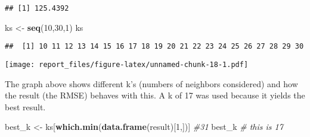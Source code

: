 \documentclass[
]{article}
\newenvironment{Shaded}{\begin{snugshade}}{\end{snugshade}}
\newcommand{\CommentTok}[1]{\textcolor[rgb]{0.56,0.35,0.01}{\textit{#1}}}
\newcommand{\ControlFlowTok}[1]{\textcolor[rgb]{0.13,0.29,0.53}{\textbf{#1}}}
\newcommand{\DataTypeTok}[1]{\textcolor[rgb]{0.13,0.29,0.53}{#1}}
\newcommand{\DecValTok}[1]{\textcolor[rgb]{0.00,0.00,0.81}{#1}}
\newcommand{\KeywordTok}[1]{\textcolor[rgb]{0.13,0.29,0.53}{\textbf{#1}}}
\newcommand{\NormalTok}[1]{#1}
\newcommand{\OperatorTok}[1]{\textcolor[rgb]{0.81,0.36,0.00}{\textbf{#1}}}
\newcommand{\StringTok}[1]{\textcolor[rgb]{0.31,0.60,0.02}{#1}}
\begin{document}
\begin{verbatim}
## [1] 125.4392
\end{verbatim}

\begin{Shaded}
\begin{Highlighting}[]
\NormalTok{ks <{-}}\StringTok{ }\KeywordTok{seq}\NormalTok{(}\DecValTok{10}\NormalTok{,}\DecValTok{30}\NormalTok{,}\DecValTok{1}\NormalTok{)}
\NormalTok{ks}
\end{Highlighting}
\end{Shaded}

\begin{verbatim}
##  [1] 10 11 12 13 14 15 16 17 18 19 20 21 22 23 24 25 26 27 28 29 30
\end{verbatim}

\begin{Shaded}
\end{Shaded}

\texttt{[image: report\_files/figure-latex/unnamed-chunk-18-1.pdf]}

The graph above shows different k's (numbers of neighbors considered)
and how the result (the RMSE) behaves with this. A k of 17 was used
because it yields the best result.

\begin{Shaded}
\begin{Highlighting}[]
\NormalTok{best\_k <{-}}\StringTok{ }\NormalTok{ks[}\KeywordTok{which.min}\NormalTok{(}\KeywordTok{data.frame}\NormalTok{(result)[}\DecValTok{1}\NormalTok{,])] }\CommentTok{\#31}
\NormalTok{best\_k }\CommentTok{\# this is 17}
\end{Highlighting}
\end{Shaded}
\end{document}
